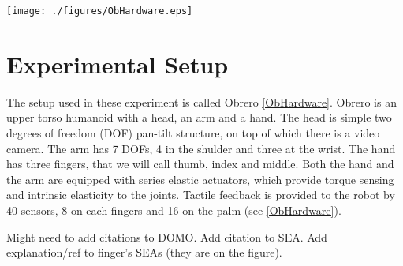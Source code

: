 \begin{figure*}[htbp]
\centerline{
\texttt{[image: ./figures/ObHardware.eps]}
} \caption[ObHardware]{The robot Obrero. (B) The robot has a 2DOF
head a 6DOF arm. (C) The hand has two fingers and a thumb. The
thumb and the middle finger can rotate 90\deg as shown in B. Each
finger has two phalanges with series elastic actuators. The two
phalanges are coupled and driven by one motor but they can
decouple. The phalanges and the palm are covered by tactile
sensors. There are 16 in the palm and 4 in each phalange. (A) The
tactile sensor is inspired in the ridges of the human skin. In A1
we can see a cut of the sensor that is made of silicon rubber. In
A2 and A3 we can see the deformation that a an applied force
 will cause. The position of the sensor's center is used as an estimation of the force applied.}
 
\label{fig:ObHardware}
\end{figure*}

\section{Experimental Setup}
%
The setup used in these experiment is called Obrero \ref{ObHardware}.
Obrero is an upper
torso humanoid with a head, an arm and a hand. The head is simple
two degrees of freedom (DOF) pan-tilt structure, on top of which
there is a video camera. The arm has 7 DOFs, 4 in the shulder and
three at the wrist. The hand has three fingers, that we will call
thumb, index and middle. Both the hand and the arm are equipped
with series elastic actuators, which provide torque sensing and
intrinsic elasticity to the joints. Tactile feedback is provided
to the robot by 40 sensors, 8 on each fingers and 16 on the palm
(see \ref{ObHardware}).

Might need to add citations to DOMO.
Add citation to SEA.
Add explanation/ref to finger's SEAs (they are on the figure).
